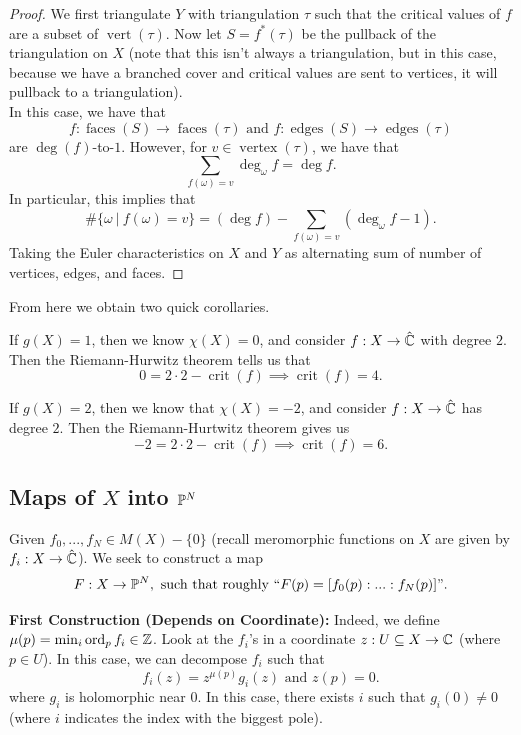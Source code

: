 \documentclass{article}
\begin{document}
{\begin{proof}
    We first triangulate $Y$ with triangulation $\tau$ such that the critical values of $f$ are a subset of $\operatorname{vert}(\tau)$. Now let $S = f^*(\tau)$ be the pullback of the triangulation on $X$ (note that this isn't always a triangulation, but in this case, because we have a branched cover and critical values are sent to vertices, it will pullback to a triangulation).\\

    In this case, we have that
    \[f: \operatorname{faces}(S) \to \operatorname{faces}(\tau) \text{ and } f: \operatorname{edges}(S) \to \operatorname{edges}(\tau)\]
    are $\deg(f)$-to-$1$. However, for $v \in \operatorname{vertex}(\tau)$, we have that
    \[\sum_{f(\omega) = v} \deg_{\omega} f = \deg f.\]
    In particular, this implies that
    \[\# \{\omega\ |\ f(\omega) = v\} = (\deg f) - \sum_{f(\omega) = v} (\deg_{\omega} f - 1).\]
    Taking the Euler characteristics on $X$ and $Y$ as alternating sum of number of vertices, edges, and faces.
\end{proof}

From here we obtain two quick corollaries.
\begin{corollary}
    If $g(X) = 1$, then we know $\chi(X) = 0$, and consider $f: X \to \hat{\mathbb{C}}$ with degree $2$. Then the Riemann-Hurwitz theorem tells us that
    \[0 = 2 \cdot 2 - \operatorname{crit}(f) \implies \operatorname{crit}(f) = 4.\]
\end{corollary}

\begin{corollary}
    If $g(X) = 2$, then we know that $\chi(X) = -2$, and consider $f: X \to \hat{\mathbb{C}}$ has degree $2$. Then the Riemann-Hurtwitz theorem gives us
    \[-2 = 2 \cdot 2 - \operatorname{crit}(f) \implies \operatorname{crit}(f) = 6.\]
\end{corollary}


\subsection{Maps of $X$ into $\mathbb{P}^N$}

Given $f_0, ..., f_N \in M(X) - \{0\}$ (recall meromorphic functions on $X$ are given by $f_i: X \to \hat{\mathbb{C}}$). We seek to construct a map
\[F: X \to \mathbb{P}^N, \text{ such that roughly } ``F(p) = [f_0(p): ... : f_N(p)]".\]

\textbf{First Construction (Depends on Coordinate): }
Indeed, we define $\mu(p) = \min_{i} \operatorname{ord}_p f_i \in \mathbb{Z}$. Look at the $f_i$'s in a coordinate $z: U \subseteq X \to \mathbb{C}$ (where $p \in U$). In this case, we can decompose $f_i$ such that
\[f_i(z) = z^{\mu(p)} g_i(z) \text{ and } z(p) = 0.\]
where $g_i$ is holomorphic near $0$. In this case, there exists $i$ such that $g_i(0) \neq 0$ (where $i$ indicates the index with the biggest pole).\\

}
\end{document}
